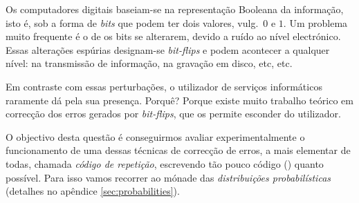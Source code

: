 \documentclass[a4paper]{article}
\begin{document}
\Problema

Os computadores digitais baseiam-se na representação Booleana da informação,
isto é, sob a forma de \emph{bits} que podem ter dois valores, vulg.\ \ensuremath{\mathrm{0}} e \ensuremath{\mathrm{1}}.
Um problema muito frequente é o de os bits se alterarem, devido a ruído ao
nível electrónico. Essas alterações espúrias designam-se \emph{bit-flips}
e podem acontecer a qualquer nível: na transmissão de informação, na gravação
em disco, etc, etc.

Em contraste com essas perturbações, o utilizador de serviços informáticos
raramente dá pela sua presença. Porquê? Porque existe muito trabalho teórico
em correcção dos erros gerados por \emph{bit-flips}, que os permite esconder
do utilizador.

O objectivo desta questão é conseguirmos avaliar experimentalmente o funcionamento
de uma dessas técnicas de correcção de erros, a mais elementar de todas,
chamada \emph{código de repetição}, escrevendo tão pouco código (\Haskell)
quanto possível. Para isso vamos recorrer ao mónade das \emph{distribuições
probabilísticas} (detalhes no apêndice \ref{sec:probabilities}).
\end{document}
